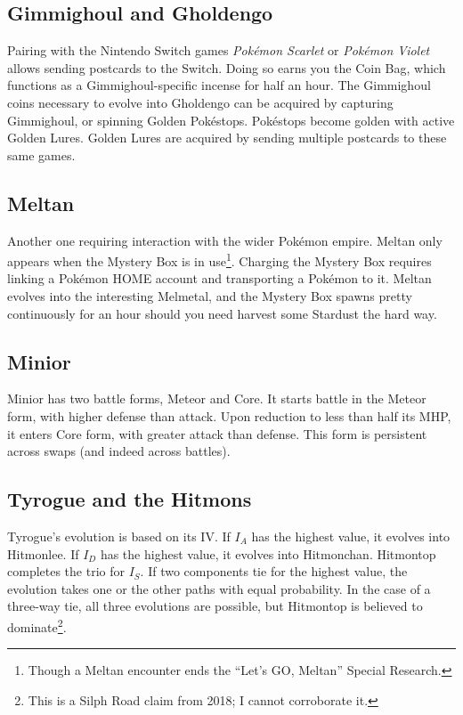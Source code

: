\subsection{Gimmighoul and Gholdengo\label{subsec:gimmighoul}}
Pairing with the Nintendo Switch games \textit{Pokémon Scarlet} or \textit{Pokémon Violet}
 allows sending postcards to the Switch.
Doing so earns you the Coin Bag, which functions as a Gimmighoul-specific incense for half an hour.
The Gimmighoul coins necessary to evolve into Gholdengo can be acquired by capturing
 Gimmighoul, or spinning Golden Pokéstops.
Pokéstops become golden with active Golden Lures.
Golden Lures are acquired by sending multiple postcards to these same games.

\subsection{Meltan\label{subsec:meltan}}
Another one requiring interaction with the wider Pokémon empire.
Meltan only appears when the Mystery Box is in use\footnote{Though a Meltan encounter ends the ``Let's GO, Meltan'' Special Research.}.
Charging the Mystery Box requires linking a Pokémon HOME account and transporting
  a Pokémon to it.
Meltan evolves into the interesting Melmetal, and the Mystery
  Box spawns pretty continuously for an hour should you need harvest some Stardust
  the hard way.

\subsection{Minior\label{subsec:minior}}
Minior has two battle forms, Meteor and Core. It starts battle in the Meteor form, with
higher defense than attack. Upon reduction to less than half its MHP, it enters
Core form, with greater attack than defense. This form is persistent across swaps
(and indeed across battles).

\subsection{Tyrogue and the Hitmons\label{subsec:tyrogue}}
Tyrogue's evolution is based on its IV\@.
If $I_A$ has the highest value, it evolves into Hitmonlee.
If $I_D$ has the highest value, it evolves into Hitmonchan.
Hitmontop completes the trio for $I_S$.
If two components tie for the highest value, the evolution takes one or the other
 paths with equal probability.
In the case of a three-way tie, all three evolutions are possible, but Hitmontop is believed to
 dominate\footnote{This is a Silph Road claim from 2018; I cannot corroborate it.}.
